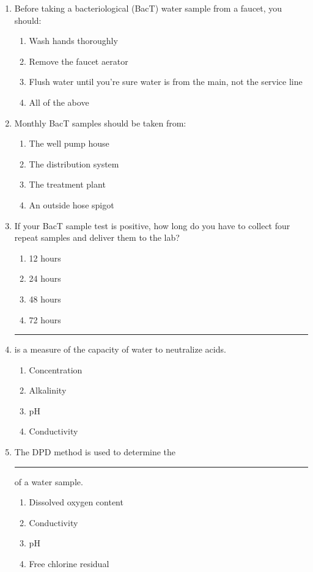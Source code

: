\documentclass{article}
\begin{document}
\begin{enumerate}[1.]
\item Before taking a bacteriological (BacT) water sample from a faucet, you should:
\begin{enumerate}
\item Wash hands thoroughly
\item Remove the faucet aerator
\item Flush water until you’re sure water is from the main, not the service line
\item All of the above
\end{enumerate}

\item Monthly BacT samples should be taken from:
\begin{enumerate}
\item The well pump house
\item The distribution system
\item The treatment plant
\item An outside hose spigot
\end{enumerate}

\item If your BacT sample test is positive, how long do you have to collect four repeat samples and deliver them to the lab?
\begin{enumerate}
\item 12 hours
\item 24 hours
\item 48 hours
\item 72 hours
\end{enumerate}

\item \rule{2cm}{0.3pt}is a measure of the capacity of water to neutralize acids.
\begin{enumerate}
\item Concentration
\item Alkalinity
\item pH
\item Conductivity
\end{enumerate}

\item The DPD method is used to determine the \rule{2cm}{0.3pt} of a water sample.
\begin{enumerate}
\item Dissolved oxygen content
\item Conductivity
\item pH
\item Free chlorine residual
\end{enumerate}


\end{enumerate}
\end{document}
